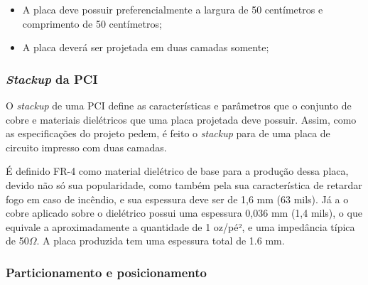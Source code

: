 \begin{itemize}
    \item A placa deve possuir preferencialmente a largura de 50 centímetros e comprimento de 50 centímetros;
    
    \item A placa deverá ser projetada em duas camadas somente; 
\end{itemize}


\subsubsection{\textit{Stackup} da PCI}

O \textit{stackup} de uma PCI define as características e parâmetros que o conjunto de cobre e materiais dielétricos que uma placa projetada deve possuir. Assim, como as especificações do projeto pedem, é feito o \textit{stackup} para de uma placa de circuito impresso com duas camadas.

É definido FR-4 como material dielétrico de base para a produção dessa placa, devido não só sua popularidade, como também pela sua característica de retardar fogo em caso de incêndio, e sua espessura deve ser de 1,6 mm (63 mils). Já a o cobre aplicado sobre o dielétrico possui uma espessura 0,036 mm (1,4 mils), o que equivale a aproximadamente a quantidade de 1 oz/pé², e uma impedância típica de 50$\Omega$. A placa produzida tem uma espessura total de 1.6 mm.


    \begin{figure}[h!]
            \captionsetup{width=7cm}
   \end{figure}  


\subsubsection{Particionamento e posicionamento}


